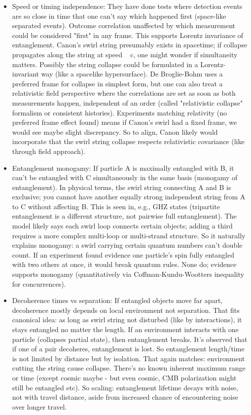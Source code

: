 \documentclass[11pt]{article}
\begin{document}
\begin{itemize}
\item 
Speed or timing independence: They have done tests where detection events are so close in time that one can't say which happened first (space-like separated events). Outcome correlation unaffected by which measurement could be considered "first" in any frame. This supports Lorentz invariance of entanglement. Canon’s swirl string presumably exists in spacetime; if collapse propagates along the string at speed ~ c, one might wonder if simultaneity matters. Possibly the string collapse could be formulated in a Lorentz-invariant way (like a spacelike hypersurface). De Broglie-Bohm uses a preferred frame for collapse in simplest form, but one can also treat a relativistic field perspective where the correlations are set as soon as both measurements happen, independent of an order (called "relativistic collapse" formalism or consistent histories). Experiments matching relativity (no preferred frame effect found) means if Canon's swirl had a fixed frame, we would see maybe slight discrepancy. So to align, Canon likely would incorporate that the swirl string collapse respects relativistic covariance (like through field approach).




\item 
Entanglement monogamy: If particle A is maximally entangled with B, it can't be entangled with C simultaneously in the same basis (monogamy of entanglement). In physical terms, the swirl string connecting A and B is exclusive; you cannot have another equally strong independent string from A to C without affecting B. This is seen in, e.g., GHZ states (tripartite entanglement is a different structure, not pairwise full entanglement). The model likely says each swirl loop connects certain objects; adding a third requires a more complex multi-loop or multi-strand structure. So it naturally explains monogamy: a swirl carrying certain quantum numbers can't double count. If an experiment found evidence one particle’s spin fully entangled with two others at once, it would break quantum rules. None do; evidence supports monogamy (quantitatively via Coffman-Kundu-Wootters inequality for concurrences).




\item 
Decoherence times vs separation: If entangled objects move far apart, decoherence mostly depends on local environment not separation. That fits canonical idea: as long as swirl string not disturbed (like by interactions), it stays entangled no matter the length. If an environment interacts with one particle (collapses partial state), then entanglement breaks. It's observed that if one of a pair decoheres, entanglement is lost. So entanglement length/time is not limited by distance but by isolation. That again matches: environment cutting the string cause collapse. There’s no known inherent maximum range or time (except cosmic maybe - but even cosmic, CMB polarization might still be entangled etc). So scaling: entanglement lifetime decays with noise, not with travel distance, aside from increased chance of encountering noise over longer travel.


\end{itemize}
\end{document}
